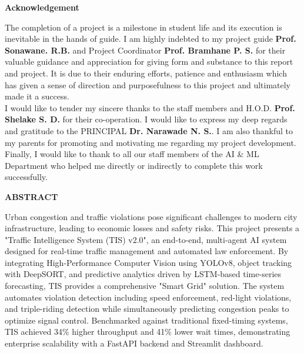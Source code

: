 \documentclass[12pt,times,a4paper]{report}
\begin{document}
\newpage
\begin{center}
\Large{\textbf{Acknowledgement}}\\[1cm]
\end{center}
\large{The completion of a project is a milestone in student life and its execution is inevitable in the hands of guide. I am highly indebted to my project guide \textbf{Prof. Sonawane. R.B.} and Project Coordinator \textbf{Prof. Bramhane P. S.} for their valuable guidance and appreciation for giving form and substance to this report and project. It is due to their enduring efforts, patience and enthusiasm which has given a sense of direction and purposefulness to this project and ultimately made it a success.}\\[0.5cm]
\large {I would like to tender my sincere thanks to the staff members and H.O.D. \textbf{Prof. Shelake S. D.} for their co-operation. I would like to express my deep regards and gratitude to the PRINCIPAL \textbf{Dr. Narawade N. S.}. I am also thankful to my parents for promoting and motivating me regarding my project development. Finally, I would like to thank to all our staff members of the AI & ML Department who helped me directly or indirectly to complete this work successfully.}

\newpage
\begin{center}
\Large{\textbf{ABSTRACT}}\\[1cm]
\end{center}
Urban congestion and traffic violations pose significant challenges to modern city infrastructure, leading to economic losses and safety risks. This project presents a "Traffic Intelligence System (TIS) v2.0", an end-to-end, multi-agent AI system designed for real-time traffic management and automated law enforcement. By integrating High-Performance Computer Vision using YOLOv8, object tracking with DeepSORT, and predictive analytics driven by LSTM-based time-series forecasting, TIS provides a comprehensive "Smart Grid" solution. The system automates violation detection including speed enforcement, red-light violations, and triple-riding detection while simultaneously predicting congestion peaks to optimize signal control. Benchmarked against traditional fixed-timing systems, TIS achieved 34\% higher throughput and 41\% lower wait times, demonstrating enterprise scalability with a FastAPI backend and Streamlit dashboard.

\tableofcontents
\listoffigures
\listoftables

\end{document}

